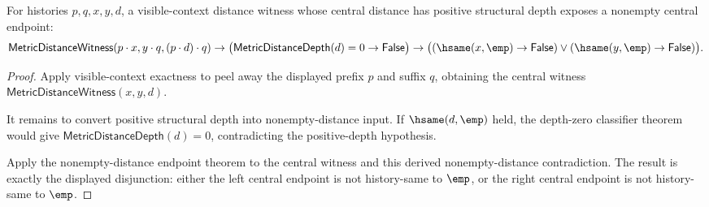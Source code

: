 \begin{theorem}
\label{thm:metric-distance-witness-visible-context-positive-depth-nonempty-endpoint}
For histories $p,q,x,y,d$, a visible-context distance witness whose central
distance has positive structural depth exposes a nonempty central endpoint:
$$
\mathsf{MetricDistanceWitness}(p\cdot x,y\cdot q,(p\cdot d)\cdot q)
\to
\bigl(\mathsf{MetricDistanceDepth}(d)=0\to\mathsf{False}\bigr)
\to
\bigl((\hsame(x,\emp)\to\mathsf{False})
\vee(\hsame(y,\emp)\to\mathsf{False})\bigr).
$$
\end{theorem}
\begin{proof}
Apply visible-context exactness to peel away the displayed prefix $p$ and
suffix $q$, obtaining the central witness
$\mathsf{MetricDistanceWitness}(x,y,d)$.

It remains to convert positive structural depth into nonempty-distance input.
If $\hsame(d,\emp)$ held, the depth-zero classifier theorem would give
$\mathsf{MetricDistanceDepth}(d)=0$, contradicting the positive-depth
hypothesis.

Apply the nonempty-distance endpoint theorem to the central witness and this
derived nonempty-distance contradiction. The result is exactly the displayed
disjunction: either the left central endpoint is not history-same to $\emp$, or
the right central endpoint is not history-same to $\emp$.
\end{proof}

